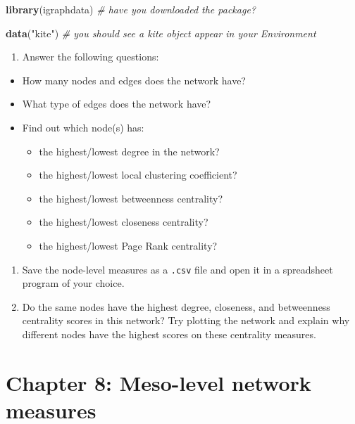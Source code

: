 \documentclass[
]{book}
\newenvironment{Shaded}{\begin{snugshade}}{\end{snugshade}}
\newcommand{\CommentTok}[1]{\textcolor[rgb]{0.56,0.35,0.01}{\textit{#1}}}
\newcommand{\FunctionTok}[1]{\textcolor[rgb]{0.13,0.29,0.53}{\textbf{#1}}}
\newcommand{\NormalTok}[1]{#1}
\newcommand{\StringTok}[1]{\textcolor[rgb]{0.31,0.60,0.02}{#1}}
\providecommand{\tightlist}{%
  \setlength{\itemsep}{0pt}\setlength{\parskip}{0pt}}
\begin{document}
\begin{Shaded}
\begin{Highlighting}[]
\FunctionTok{library}\NormalTok{(igraphdata) }\CommentTok{\# have you downloaded the package? }

\FunctionTok{data}\NormalTok{(}\StringTok{"kite"}\NormalTok{) }\CommentTok{\# you should see a kite object appear in your Environment}
\end{Highlighting}
\end{Shaded}

\begin{enumerate}
\def\labelenumi{\arabic{enumi}.}
\setcounter{enumi}{1}
\tightlist
\item
  Answer the following questions:
\end{enumerate}

\begin{itemize}
\item
  How many nodes and edges does the network have?
\item
  What type of edges does the network have?
\item
  Find out which node(s) has:

  \begin{itemize}
  \tightlist
  \item
    the highest/lowest degree in the network?
  \item
    the highest/lowest local clustering coefficient?
  \item
    the highest/lowest betweenness centrality?
  \item
    the highest/lowest closeness centrality?
  \item
    the highest/lowest Page Rank centrality?
  \end{itemize}
\end{itemize}

\begin{enumerate}
\def\labelenumi{\arabic{enumi}.}
\setcounter{enumi}{2}
\item
  Save the node-level measures as a \texttt{.csv} file and open it in a spreadsheet program of your choice.
\item
  Do the same nodes have the highest degree, closeness, and betweenness centrality scores in this network? Try plotting the network and explain why different nodes have the highest scores on these centrality measures.
\end{enumerate}

\chapter{Chapter 8: Meso-level network measures}\label{ch8}
\end{document}

